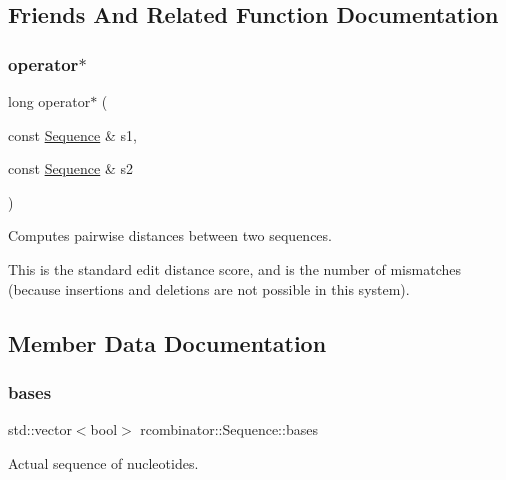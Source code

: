 \subsection{Friends And Related Function Documentation}
\mbox{\label{classrcombinator_1_1Sequence_abdc71a8f6617dcb6ab73f0e07eb63b67}} 
\subsubsection{\texorpdfstring{operator$\ast$}{operator*}}
{\footnotesize\ttfamily long operator$\ast$ (\begin{DoxyParamCaption}\item[{const \mbox{\hyperlink{classrcombinator_1_1Sequence}{Sequence}} \&}]{s1,  }\item[{const \mbox{\hyperlink{classrcombinator_1_1Sequence}{Sequence}} \&}]{s2 }\end{DoxyParamCaption})\hspace{0.3cm}{\ttfamily [friend]}}



Computes pairwise distances between two sequences. 

This is the standard edit distance score, and is the number of mismatches (because insertions and deletions are not possible in this system). 

\subsection{Member Data Documentation}
\mbox{\label{classrcombinator_1_1Sequence_ab37aa0bdc97b3d923407e3a7e17b3209}} 
\subsubsection{\texorpdfstring{bases}{bases}}
{\footnotesize\ttfamily std\+::vector$<$bool$>$ rcombinator\+::\+Sequence\+::bases\hspace{0.3cm}{\ttfamily [private]}}



Actual sequence of nucleotides. 

